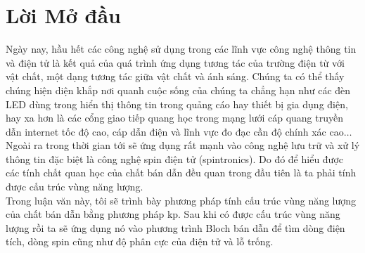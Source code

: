 \chapter{Lời Mở đầu}
\label{Chapter0} %
Ngày nay, hầu hết các công nghệ sử dụng trong các lĩnh vực công nghệ thông tin và điện tử là kết quả của quá trình ứng dụng tương tác của trường điện từ với vật chất, một dạng tương tác giữa vật chất và ánh sáng. Chúng ta có thể thấy chúng hiện diện khắp nơi quanh cuộc sống của chúng ta chẳng hạn như các đèn LED dùng trong hiển  thị thông tin trong quảng cáo hay thiết bị gia dụng điện, hay xa hơn là các cổng giao tiếp quang học trong mạng lưới cáp quang truyền dẫn internet tốc độ cao, cáp dẫn điện và lĩnh vực đo đạc cần độ chính xác cao$\dots$Ngoài ra trong thời gian tới sẽ ứng dụng rất mạnh vào công nghệ  lưu trữ và xử lý thông tin đặc biệt là công nghệ spin điện tử (spintronics). Do đó để hiểu được các tính chất quan học của chất bán dẫn đều quan trong đầu tiên là ta phải tính được cấu trúc vùng năng lượng.\\
Trong luận văn này, tôi sẽ trình bày phương pháp tính cấu trúc vùng năng lượng của chất bán dẫn bằng phương pháp kp. Sau khi có được cấu trúc vùng năng lượng rồi ta sẽ ứng dụng nó vào phương trình Bloch bán dẫn để tìm dòng điện tích, dòng spin cũng như độ phân cực của điện tử và lỗ trống.
